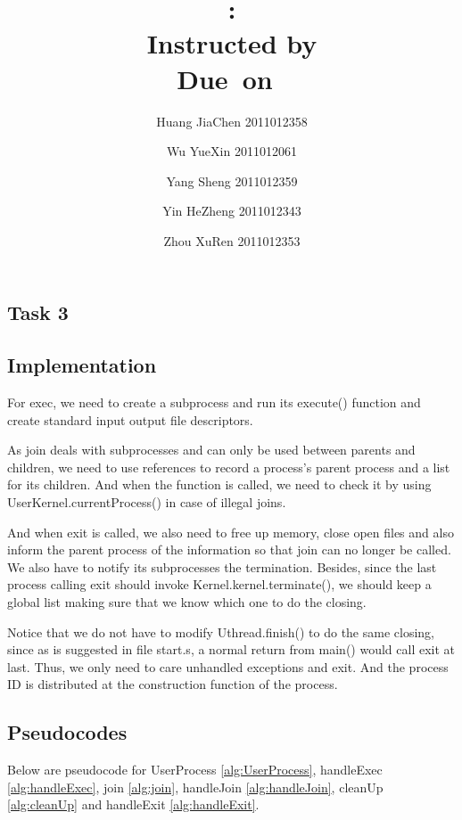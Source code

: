 \documentclass{article}
\title{\textmd{\bf \Class: \Title}\\{\large Instructed by \textit{\ClassInstructor}}\\\normalsize\vspace{0.1in}\small{Due\ on\ \DueDate}}
\date{}
\author{%
  Huang JiaChen 2011012358 \and
  Wu YueXin 2011012061 \and
  Yang Sheng 2011012359 \and
  Yin HeZheng 2011012343 \and
  Zhou XuRen 2011012353}
\begin{document}
  \begin{spacing}{1.1}
    \maketitle \thispagestyle{empty}



\section{Task 3}
\subsection{Implementation}
For \textsf{exec}, we need to create a subprocess and run its \textsf{execute()} function and create standard input output file descriptors.

As \textsf{join} deals with subprocesses and can only be used between parents and children, we need to use references to record a process's parent process and a list for its children. And when the function is called, we need to check it by using \textsf{UserKernel.currentProcess()} in case of illegal joins.

And when \textsf{exit} is called, we also need to free up memory, close open files and also inform the parent process of the information so that \textsf{join} can no longer be called. We also have to notify its subprocesses the termination. Besides, since the last process calling \textsf{exit} should invoke \textsf{Kernel.kernel.terminate()}, we should keep a global list making sure that we know which one to do the closing.

Notice that we do not have to modify \textsf{Uthread.finish()} to do the same closing, since as is suggested in file \textsf{start.s}, a normal return from \textsf{main()} would call \textsf{exit} at last. Thus, we only need to care unhandled exceptions and \textsf{exit}. And the process ID is distributed at the construction function of the process.
\subsection{Pseudocodes}
Below are pseudocode for \textsf{UserProcess} \ref{alg:UserProcess}, \textsf{handleExec} \ref{alg:handleExec}, \textsf{join} \ref{alg:join}, \textsf{handleJoin} \ref{alg:handleJoin}, \textsf{cleanUp} \ref{alg:cleanUp} and \textsf{handleExit} \ref{alg:handleExit}.


\end{spacing}
\end{document}
